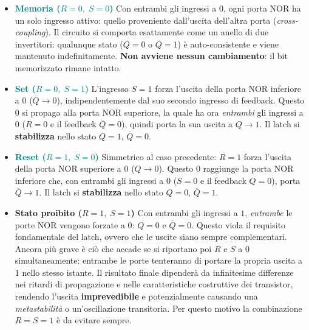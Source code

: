\documentclass[11pt,a4paper]{report}
\begin{document}
\begin{itemize}[leftmargin=1.5em, itemsep=4pt]

    \item \textcolor{teal}{\textbf{Memoria ($R=0,\;S=0$)}}\quad
    Con entrambi gli ingressi a $0$, ogni porta NOR ha un solo ingresso attivo: quello proveniente
    dall'uscita dell'altra porta (\emph{cross-coupling}). Il circuito si comporta esattamente come
    un anello di due invertitori: qualunque stato ($Q=0$ o $Q=1$) è auto-consistente e viene
    mantenuto indefinitamente. \textbf{Non avviene nessun cambiamento}: il bit memorizzato rimane
    intatto.

    \item \textcolor{teal}{\textbf{Set ($R=0,\;S=1$)}}\quad
    L'ingresso $S=1$ forza l'uscita della porta NOR inferiore a $0$
    ($\overline{Q}\to 0$), indipendentemente dal suo secondo ingresso di feedback.
    Questo $0$ si propaga alla porta NOR superiore, la quale ha ora \emph{entrambi} gli ingressi
    a $0$ ($R=0$ e il feedback $\overline{Q}=0$), quindi porta la sua uscita a
    $Q\to 1$. Il latch si \textbf{stabilizza} nello stato $Q=1$, $\overline{Q}=0$.

    \item \textcolor{teal}{\textbf{Reset ($R=1,\;S=0$)}}\quad
    Simmetrico al caso precedente: $R=1$ forza l'uscita della porta NOR superiore a $0$
    ($Q\to 0$). Questo $0$ raggiunge la porta NOR inferiore che, con entrambi gli ingressi
    a $0$ ($S=0$ e il feedback $Q=0$), porta $\overline{Q}\to 1$.
    Il latch si \textbf{stabilizza} nello stato $Q=0$, $\overline{Q}=1$.

    \item \textcolor{red!70!black}{\textbf{Stato proibito ($R=1,\;S=1$)}}\quad
    Con entrambi gli ingressi a $1$, \emph{entrambe} le porte NOR vengono forzate
    a $0$: $Q=0$ e $\overline{Q}=0$. Questo viola il requisito fondamentale del latch,
    ovvero che le uscite siano sempre complementari. Ancora più grave è ciò che accade
    se si riportano poi $R$ e $S$ a $0$ simultaneamente: entrambe le porte
    tenteranno di portare la propria uscita a $1$ nello stesso istante.
    Il risultato finale dipenderà da infinitesime differenze nei ritardi di propagazione
    e nelle caratteristiche costruttive dei transistor, rendendo l'uscita
    \textbf{imprevedibile} e potenzialmente causando una \emph{metastabilità} o
    un'oscillazione transitoria. Per questo motivo la combinazione $R=S=1$ è da
    evitare sempre.

\end{itemize}
\end{document}
